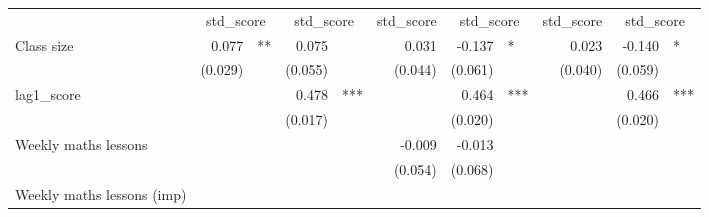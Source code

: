 \documentclass{article}
\begin{document}
\begin{table}[!h]
\centering
\begin{tabular}{lllllllllll}
\cline{1-11}
\multicolumn{1}{r}{} &
  \multicolumn{2}{c}{std\_score} &
  \multicolumn{2}{c}{std\_score} &
  \multicolumn{1}{c}{std\_score} &
  \multicolumn{2}{c}{std\_score} &
  \multicolumn{1}{c}{std\_score} &
  \multicolumn{2}{c}{std\_score} \\
\cline{1-11}
\multicolumn{1}{l}{Class size} &
  \multicolumn{1}{r}{0.077} &
  \multicolumn{1}{l}{**} &
  \multicolumn{1}{r}{0.075} &
  \multicolumn{1}{l}{} &
  \multicolumn{1}{r}{0.031} &
  \multicolumn{1}{r}{-0.137} &
  \multicolumn{1}{l}{*} &
  \multicolumn{1}{r}{0.023} &
  \multicolumn{1}{r}{-0.140} &
  \multicolumn{1}{l}{*} \\
\multicolumn{1}{l}{} &
  \multicolumn{1}{r}{(0.029)} &
  \multicolumn{1}{l}{} &
  \multicolumn{1}{r}{(0.055)} &
  \multicolumn{1}{l}{} &
  \multicolumn{1}{r}{(0.044)} &
  \multicolumn{1}{r}{(0.061)} &
  \multicolumn{1}{l}{} &
  \multicolumn{1}{r}{(0.040)} &
  \multicolumn{1}{r}{(0.059)} &
  \multicolumn{1}{l}{} \\
\multicolumn{1}{l}{lag1\_score} &
  \multicolumn{1}{r}{} &
  \multicolumn{1}{l}{} &
  \multicolumn{1}{r}{0.478} &
  \multicolumn{1}{l}{***} &
  \multicolumn{1}{r}{} &
  \multicolumn{1}{r}{0.464} &
  \multicolumn{1}{l}{***} &
  \multicolumn{1}{r}{} &
  \multicolumn{1}{r}{0.466} &
  \multicolumn{1}{l}{***} \\
\multicolumn{1}{l}{} &
  \multicolumn{1}{r}{} &
  \multicolumn{1}{l}{} &
  \multicolumn{1}{r}{(0.017)} &
  \multicolumn{1}{l}{} &
  \multicolumn{1}{r}{} &
  \multicolumn{1}{r}{(0.020)} &
  \multicolumn{1}{l}{} &
  \multicolumn{1}{r}{} &
  \multicolumn{1}{r}{(0.020)} &
  \multicolumn{1}{l}{} \\
\multicolumn{1}{l}{Weekly maths lessons} &
  \multicolumn{1}{r}{} &
  \multicolumn{1}{l}{} &
  \multicolumn{1}{r}{} &
  \multicolumn{1}{l}{} &
  \multicolumn{1}{r}{-0.009} &
  \multicolumn{1}{r}{-0.013} &
  \multicolumn{1}{l}{} &
  \multicolumn{1}{r}{} &
  \multicolumn{1}{r}{} &
  \multicolumn{1}{l}{} \\
\multicolumn{1}{l}{} &
  \multicolumn{1}{r}{} &
  \multicolumn{1}{l}{} &
  \multicolumn{1}{r}{} &
  \multicolumn{1}{l}{} &
  \multicolumn{1}{r}{(0.054)} &
  \multicolumn{1}{r}{(0.068)} &
  \multicolumn{1}{l}{} &
  \multicolumn{1}{r}{} &
  \multicolumn{1}{r}{} &
  \multicolumn{1}{l}{} \\
\multicolumn{1}{l}{Weekly maths lessons (imp)} &
  \multicolumn{1}{r}{} &
  \multicolumn{1}{l}{} &

\end{tabular}
\end{table}
\end{document}
